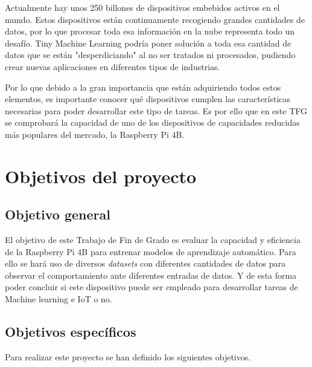 \documentclass[a4paper, 12pt]{book}
\begin{document}
Actualmente hay unos 250 billones de dispositivos embebidos activos en el mundo. Estos dispositivos están continuamente recogiendo grandes cantidades de datos, por lo que procesar toda esa información en la nube representa todo un desafío. Tiny Machine Learning podría poner solución a toda esa cantidad de datos que se están "desperdiciando" al no ser tratados ni procesados, pudiendo crear nuevas aplicaciones en diferentes tipos de industrias.

Por lo que debido a la gran importancia que están adquiriendo todos estos elementos, es importante conocer qué dispositivos cumplen las características necesarias para poder desarrollar este tipo de tareas. Es por ello que en este TFG se comprobará la capacidad de uno de los dispositivos de capacidades reducidas más populares del mercado, la Raspberry Pi 4B. 



\section{Objetivos del proyecto}
\label{sec:objetivos}

\subsection{Objetivo general} %
\label{sec:objetivo-general} %


El objetivo de este Trabajo de Fin de Grado es evaluar la capacidad y eficiencia de la Raspberry Pi 4B para entrenar modelos de aprendizaje automático. Para ello se hará uso de diversos \textit{datasets} con diferentes cantidades de datos para observar el comportamiento ante diferentes entradas de datos. Y de esta forma poder concluir si este dispositivo puede ser empleado para desarrollar tareas de Machine learning e IoT o no.


\subsection{Objetivos específicos}
\label{sec:objetivos-especificos}

Para realizar este proyecto se han definido los siguientes objetivos.
\end{document}
